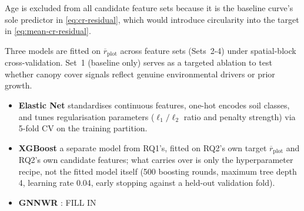 \documentclass[logo,msc,ai]{infthesis}           %
\begin{document}
Age is excluded from all candidate feature sets because it is the baseline curve's sole predictor in \eqref{eq:cr-residual}, which would introduce circularity into the target in \eqref{eq:mean-cr-residual}.

Three models are fitted on $\overline{r}_{\text{plot}}$ across feature sets (Sets~2-4) under spatial-block cross-validation. Set~1 (baseline only) serves as a targeted ablation to test whether canopy cover signals reflect genuine environmental drivers or prior growth.

\begin{itemize}
\item \textbf{Elastic Net} standardises continuous features, one-hot encodes soil classes, and tunes regularisation parameters ($\ell_1/\ell_2$ ratio and penalty strength) via 5-fold CV on the training partition.
\item \textbf{XGBoost} a separate model from RQ1's, fitted on RQ2's own target
  $\overline{r}_{\text{plot}}$ and RQ2's own candidate features;
  what carries over is only the hyperparameter recipe, not the fitted model itself (500 boosting
  rounds, maximum tree depth 4, learning rate 0.04, early stopping against a held-out validation fold).
\item \textbf{GNNWR} : FILL IN 
\end{itemize}
\end{document}
